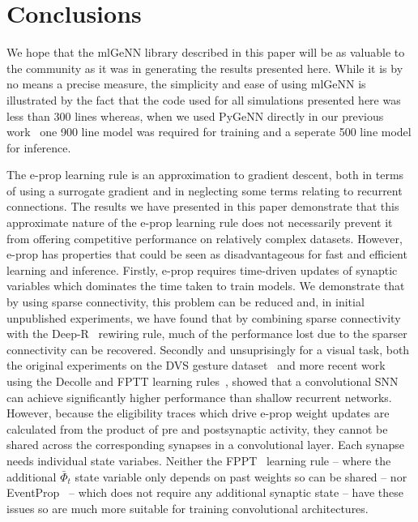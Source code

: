 \documentclass[sigconf]{acmart}
\begin{document}
\section{Conclusions}
We hope that the mlGeNN library described in this paper will be as valuable to the community as it was in generating the results presented here.
While it is by no means a precise measure, the simplicity and ease of
using mlGeNN is illustrated by the fact that the code used for all
simulations presented here was less than \num{300} lines whereas, when we used PyGeNN directly in our previous work~\citep{Knight2022} one \num{900} line model was required for training and a seperate \num{500} line model for inference.

The e-prop learning rule is an approximation to gradient descent, both in terms of using a surrogate gradient and in neglecting some terms relating to recurrent connections.
The results we have presented in this paper demonstrate that this approximate nature of the e-prop learning rule does not necessarily prevent it from offering competitive performance on relatively complex datasets.
However, e-prop has properties that could be seen as disadvantageous for fast and efficient learning and inference.
Firstly, e-prop requires time-driven updates of synaptic variables which dominates the time taken to train models.
We demonstrate that by using sparse connectivity, this problem can be reduced and, in initial unpublished experiments, we have found that by combining sparse connectivity with the Deep-R~\citep{Bellec2018a} rewiring rule, much of the performance lost due to the sparser connectivity can be recovered.
Secondly and unsuprisingly for a visual task, both the original experiments on the DVS gesture dataset~\citep{amir_low_2017} and more recent work using the Decolle and FPTT learning rules~\citep{Kaiser2020,yin2021accurate}, showed that a convolutional SNN can achieve significantly higher performance than shallow recurrent networks.
However, because the eligibility traces which drive e-prop weight updates are calculated from the product of pre and postsynaptic activity, they cannot be shared across the corresponding synapses in a convolutional layer.
Each synapse needs individual state variabes.
Neither the FPPT~\citep{yin2021accurate} learning rule -- where the additional $\bar{\Phi}_t$ state variable only depends on past weights so can be shared -- nor EventProp~\citep{Wunderlich2021} -- which does not require any additional synaptic state -- have these issues so are much more suitable for training convolutional architectures.
\end{document}
